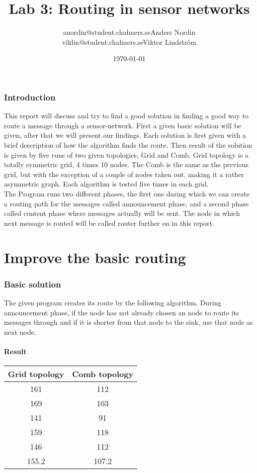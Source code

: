 \documentclass{article}
\title{Lab 3: Routing in sensor networks}
\author{anordin@student.chalmers.se\quad Anders Nordin\\
        viklin@student.chalmers.se\quad Viktor Lindstr\"{o}m}
\date{\today}
\begin{document}
\maketitle
\newpage

\section{Introduction}
  This report will discuss and try to find a good solution in finding a 
  good way to route a message through a sensor-network.
  First a given basic solution will be given, after that
  we will present our findings. Each solution is first given with
  a brief description of how the algorithm finds the route. Then 
  result of the solution is given by five runs of two given topologies,
  Grid and Comb. Grid topology is a totally symmetric grid, 4 times 10 nodes.
  The Comb is the same as the previous grid, but with the exception of
  a couple of nodes taken out, making it a rather asymmetric graph.
  Each algorithm is tested five times in each grid.\\
  The Program runs two different phases, the first one during 
  which we can create a routing path for the messages called 
  announcement phase, and a second phase called content phase where
  messages actually will be sent. The node in which next message
  is routed will be called router further on in this report.
\part{Improve the basic routing}
\section{Basic solution}
  The given program creates its route by the following algorithm.
  During announcement phase, if the node has not already chosen an 
  node to route its messages through and if it is shorter
  from that node to the sink, use that node as next node.
  \subsection{Result}
    \begin{tabular}{c|c}
      Grid topology & Comb topology\\
      \hline
      \hline
      161 & 112\\
      169 & 103\\
      141 & 91\\
      159 & 118\\
      146 & 112\\
      \hline
      155.2&107.2\\
    \end{tabular}
\end{document}

